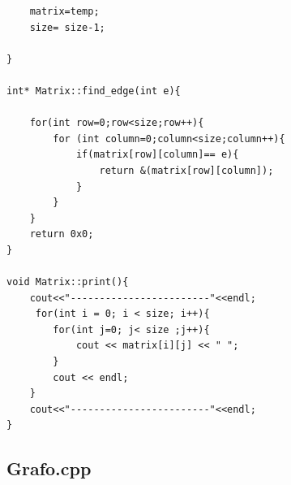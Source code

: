 \documentclass[11pt]{article}
\begin{document}
\begin{lstlisting}
    matrix=temp;
    size= size-1;
    
}

int* Matrix::find_edge(int e){

    for(int row=0;row<size;row++){
        for (int column=0;column<size;column++){
            if(matrix[row][column]== e){
                return &(matrix[row][column]);
            }
        }
    }
    return 0x0;
}

void Matrix::print(){
    cout<<"------------------------"<<endl;
     for(int i = 0; i < size; i++){
        for(int j=0; j< size ;j++){
            cout << matrix[i][j] << " ";
        }
        cout << endl;
    }
    cout<<"------------------------"<<endl;
}
\end{lstlisting}
\newpage 
\subsection{Grafo.cpp}
\lstset {language=C}
\end{document}
